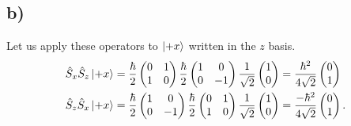\documentclass[
	12pt,
	]{article}
\theoremstyle{definition}
\theoremstyle{definition}
\theoremstyle{definition}
\theoremstyle{definition}
\theoremstyle{definition}
\theoremstyle{example}
\theoremstyle{note}
\theoremstyle{remark}
\theoremstyle{example}
\begin{document}
 				\subsection*{b) }
 					Let us apply these operators to $\ket{+x}$ written in the $z$ basis. 
 					\begin{align*}
 						\hat{S}_{x} \hat{S}_{z} \ket{+x} &= \frac{\hbar}{2} \begin{pmatrix}
 						0 & 1 \\1& 0 
 						\end{pmatrix} \frac{\hbar}{2} \begin{pmatrix}
 						1 & 0 \\0 & -1 
 						\end{pmatrix}
 						\frac{1}{\sqrt{2}} \begin{pmatrix}
 						1 \\ 0
 						\end{pmatrix} = \frac{\hbar^{2}}{4 \sqrt{2}} \begin{pmatrix}
 						0 \\1
 						\end{pmatrix} \\
 						\hat{S}_{z} \hat{S}_{x} \ket{+x} &= \frac{\hbar}{2} \begin{pmatrix}
 						1 & 0 \\0 & -1 
 						\end{pmatrix} \frac{\hbar}{2} \begin{pmatrix}
 						 0 & 1 \\1 & 0 
 						\end{pmatrix}
 						\frac{1}{\sqrt{2}} 
 						\begin{pmatrix}
 						1 \\ 0
 						\end{pmatrix} = \frac{-\hbar^{2}}{4 \sqrt{2}} \begin{pmatrix}
 						0 \\ 1
 						\end{pmatrix}.
 					\end{align*}
				
	
\end{document}
